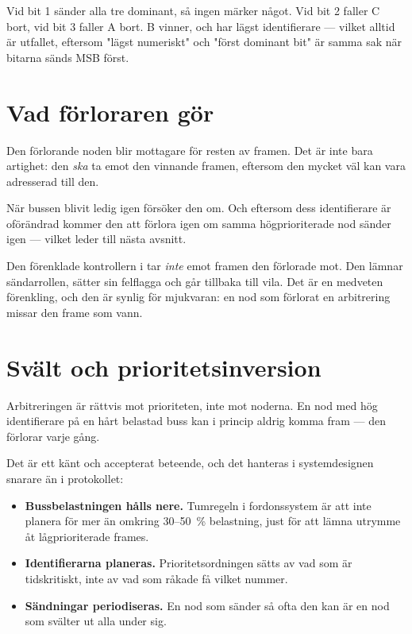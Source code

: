 Vid bit 1 sänder alla tre dominant, så ingen märker något. Vid bit 2 faller C bort, vid bit 3
faller A bort. B vinner, och har lägst identifierare --- vilket alltid är utfallet, eftersom
"lägst numeriskt" och "först dominant bit" är samma sak när bitarna sänds MSB först.

\section{Vad förloraren gör}

Den förlorande noden blir mottagare för resten av framen. Det är inte bara artighet: den
\emph{ska} ta emot den vinnande framen, eftersom den mycket väl kan vara adresserad till den.

När bussen blivit ledig igen försöker den om. Och eftersom dess identifierare är oförändrad
kommer den att förlora igen om samma högprioriterade nod sänder igen --- vilket leder till nästa
avsnitt.

\begin{simplification}
\note[Förenkling] Den förenklade kontrollern i  tar \emph{inte} emot framen den
förlorade mot. Den lämnar sändarrollen, sätter sin felflagga och går tillbaka till vila. Det är
en medveten förenkling, och den är synlig för mjukvaran: en nod som förlorat en arbitrering
missar den frame som vann.
\end{simplification}

\section{Svält och prioritetsinversion}

Arbitreringen är rättvis mot prioriteten, inte mot noderna. En nod med hög identifierare på en
hårt belastad buss kan i princip aldrig komma fram --- den förlorar varje gång.

Det är ett känt och accepterat beteende, och det hanteras i systemdesignen snarare än i
protokollet:

\begin{itemize}
  \item \textbf{Bussbelastningen hålls nere.} Tumregeln i fordonssystem är att inte planera för
    mer än omkring 30--50~\% belastning, just för att lämna utrymme åt lågprioriterade frames.
  \item \textbf{Identifierarna planeras.} Prioritetsordningen sätts av vad som är tidskritiskt,
    inte av vad som råkade få vilket nummer.
  \item \textbf{Sändningar periodiseras.} En nod som sänder så ofta den kan är en nod som svälter
    ut alla under sig.
\end{itemize}

